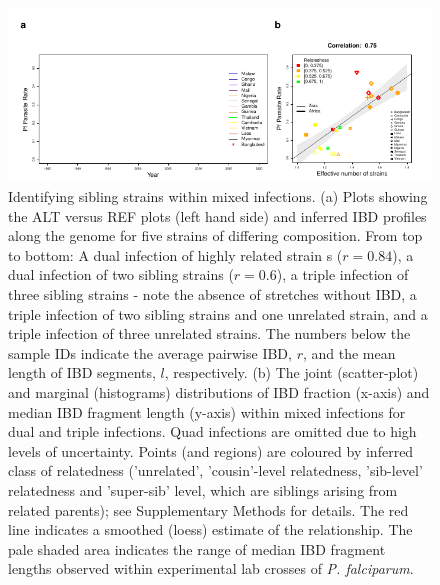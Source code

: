 \documentclass[9pt,lineno]{elife}
\begin{document}
\begin{figure}[h]
  \begin{center}
  \includegraphics[width=\textwidth]{Fig4.pdf}
   \caption{Identifying sibling strains within mixed infections.  (a) Plots showing the ALT versus REF plots (left hand side) and inferred IBD profiles along the genome for five strains of differing composition.  From top to bottom: A dual infection of highly related strain s ($r=0.84$), a dual infection of two sibling strains ($r=0.6$), a triple infection of three sibling strains - note the absence of stretches without IBD, a triple infection of two sibling strains and one unrelated strain, and a triple infection of three unrelated strains.  The numbers below the sample IDs indicate the average pairwise IBD, $r$, and the mean length of IBD segments, $l$, respectively.  (b) The joint (scatter-plot) and marginal (histograms) distributions of IBD fraction (x-axis) and median IBD fragment length (y-axis) within mixed infections for dual and triple infections.  Quad infections are omitted due to high levels of uncertainty. Points (and regions) are coloured by inferred class of relatedness ('unrelated', 'cousin'-level relatedness, 'sib-level' relatedness and 'super-sib' level, which are siblings arising from related parents); see Supplementary Methods for details.  The red line indicates a smoothed (loess) estimate of the relationship. The pale shaded area indicates the range of median IBD fragment lengths observed within experimental lab crosses of {\it P. falciparum}.}\label{fig:strainIBD}
   \end{center}
\end{figure}
\end{document}
